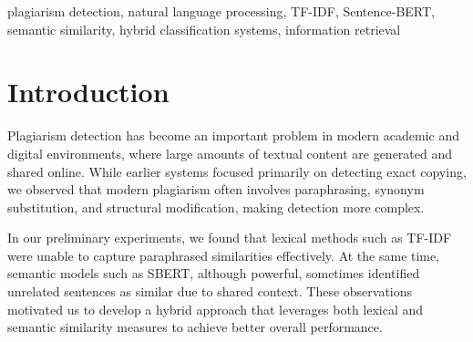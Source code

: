 \documentclass[conference]{IEEEtran}
\begin{document}
\begin{abstract}
Plagiarism detection has become increasingly challenging with the widespread use of paraphrasing and semantic rewriting techniques. In our initial study, we observed that traditional lexical approaches such as TF-IDF are effective for identifying exact matches but fail to capture deeper semantic similarities. On the other hand, transformer-based models such as Sentence-BERT (SBERT) can detect semantic similarity but often introduce false positives.

To address these issues, we designed and implemented a hybrid plagiarism detection system that integrates exact matching, TF-IDF-based lexical similarity, and SBERT-based semantic similarity within a unified pipeline. During experimentation, we noticed that combining these approaches, along with a top-K matching strategy and filtering mechanism, significantly improves detection performance.

Our evaluation on a balanced subset of the PAN dataset shows that the hybrid model achieves a recall of 0.97 and an F1-score of 0.67. These results indicate that combining lexical and semantic signals provides a more reliable solution for detecting both exact and paraphrased plagiarism.
\end{abstract}

\begin{IEEEkeywords}
plagiarism detection, natural language processing, TF-IDF, Sentence-BERT, semantic similarity, hybrid classification systems, information retrieval
\end{IEEEkeywords}

\section{Introduction}
Plagiarism detection has become an important problem in modern academic and digital environments, where large amounts of textual content are generated and shared online. While earlier systems focused primarily on detecting exact copying, we observed that modern plagiarism often involves paraphrasing, synonym substitution, and structural modification, making detection more complex.

In our preliminary experiments, we found that lexical methods such as TF-IDF were unable to capture paraphrased similarities effectively. At the same time, semantic models such as SBERT, although powerful, sometimes identified unrelated sentences as similar due to shared context. These observations motivated us to develop a hybrid approach that leverages both lexical and semantic similarity measures to achieve better overall performance.
\end{document}
